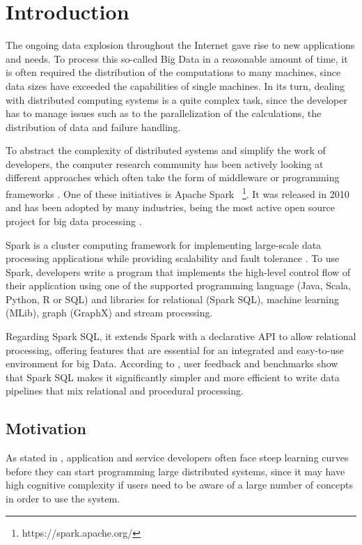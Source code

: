 \chapter{Introduction}

The ongoing data explosion throughout the Internet gave rise to new applications and needs. To process this so-called Big Data in a reasonable amount of time, it is often required the distribution of the computations to many machines, since data sizes have exceeded the capabilities of single machines. In its turn, dealing with distributed computing systems is a quite complex task, since the developer has to manage issues such as to the parallelization of the calculations, the distribution of data and failure handling.

To abstract the complexity of distributed systems and simplify the work of developers, the computer research community has been actively looking at different approaches which often take the form of middleware or programming frameworks \cite{ranganathan2007complexity}. One of these initiatives is Apache Spark ~\footnote{https://spark.apache.org/}. It was released in 2010 and has been adopted by many industries, being the most active open source project for big data processing \cite{armbrust2015sparksql}. 

Spark is a cluster computing framework for implementing large-scale data processing applications while providing scalability and fault tolerance \cite{zaharia2010spark}. To use Spark, developers write a program that implements the high-level control flow of their application using one of the supported programming language (Java, Scala, Python, R or SQL) and libraries for relational (Spark SQL), machine learning (MLib), graph (GraphX) and stream processing.

Regarding Spark SQL, it extends Spark with a declarative API to allow relational processing, offering features that are essential for an integrated and easy-to-use environment for big Data. According to \cite{armbrust2015sparksql}, user feedback and benchmarks show that Spark SQL makes it significantly simpler and more efficient to write data pipelines that mix relational and procedural processing. 

\section{Motivation}

As stated in \cite{ranganathan2007complexity}, application and service developers often face steep learning curves before they can start programming large distributed systems, since it may have high cognitive complexity if users need to be aware of a large number of concepts in order to use the system. 

